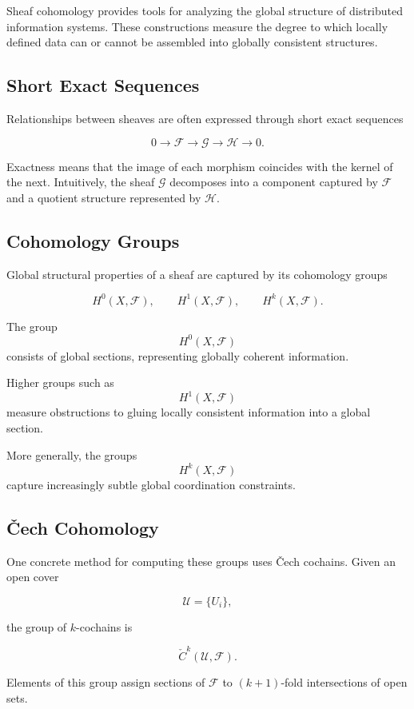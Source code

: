 \documentclass[12pt]{article}
\begin{document}
Sheaf cohomology provides tools for analyzing the global structure of distributed information systems. These constructions measure the degree to which locally defined data can or cannot be assembled into globally consistent structures.

\subsection{Short Exact Sequences}

Relationships between sheaves are often expressed through short exact sequences

\[
0 \rightarrow \mathcal{F} \rightarrow \mathcal{G} \rightarrow \mathcal{H} \rightarrow 0.
\]

Exactness means that the image of each morphism coincides with the kernel of the next. Intuitively, the sheaf $\mathcal{G}$ decomposes into a component captured by $\mathcal{F}$ and a quotient structure represented by $\mathcal{H}$.

\subsection{Cohomology Groups}

Global structural properties of a sheaf are captured by its cohomology groups

\[
H^0(X,\mathcal{F}), \qquad H^1(X,\mathcal{F}), \qquad H^k(X,\mathcal{F}).
\]

The group
\[
H^0(X,\mathcal{F})
\]
consists of global sections, representing globally coherent information.

Higher groups such as
\[
H^1(X,\mathcal{F})
\]
measure obstructions to gluing locally consistent information into a global section.

More generally, the groups
\[
H^k(X,\mathcal{F})
\]
capture increasingly subtle global coordination constraints.

\subsection{Čech Cohomology}

One concrete method for computing these groups uses Čech cochains. Given an open cover

\[
\mathcal{U} = \{U_i\},
\]

the group of $k$-cochains is

\[
\check{C}^k(\mathcal{U},\mathcal{F}).
\]

Elements of this group assign sections of $\mathcal{F}$ to $(k+1)$-fold intersections of open sets.
\end{document}
